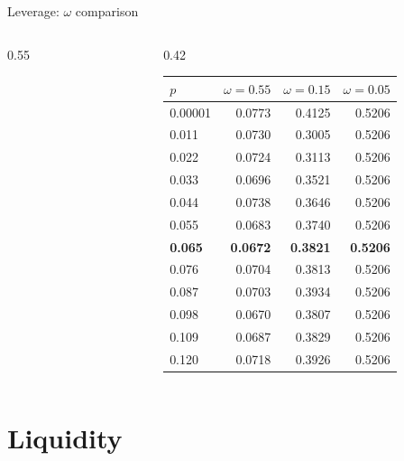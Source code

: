 \documentclass[aspectratio=169,10pt]{beamer}
\begin{document}
\begin{frame}{Leverage: $\omega$ comparison}
\begin{columns}[T]
\begin{column}{0.55\textwidth}
\begin{figure}
      \end{figure}
    \end{column}
    \begin{column}{0.42\textwidth}
      \footnotesize\renewcommand{\arraystretch}{0.85}\setlength{\tabcolsep}{3pt}
      \begin{tabular}{lrrr}
        \toprule
        $p$ & $\omega=0.55$ & $\omega=0.15$ & $\omega=0.05$ \\
        \midrule
        0.00001 & 0.0773 & 0.4125 & 0.5206 \\
        0.011 & 0.0730 & 0.3005 & 0.5206 \\
        0.022 & 0.0724 & 0.3113 & 0.5206 \\
        0.033 & 0.0696 & 0.3521 & 0.5206 \\
        0.044 & 0.0738 & 0.3646 & 0.5206 \\
        0.055 & 0.0683 & 0.3740 & 0.5206 \\
        \textbf{0.065} & \textbf{0.0672} & \textbf{0.3821} & \textbf{0.5206} \\
        0.076 & 0.0704 & 0.3813 & 0.5206 \\
        0.087 & 0.0703 & 0.3934 & 0.5206 \\
        0.098 & 0.0670 & 0.3807 & 0.5206 \\
        0.109 & 0.0687 & 0.3829 & 0.5206 \\
        0.120 & 0.0718 & 0.3926 & 0.5206 \\
        \bottomrule
      \end{tabular}
    \end{column}
  \end{columns}
\end{frame}

\section{Liquidity}
\end{document}
